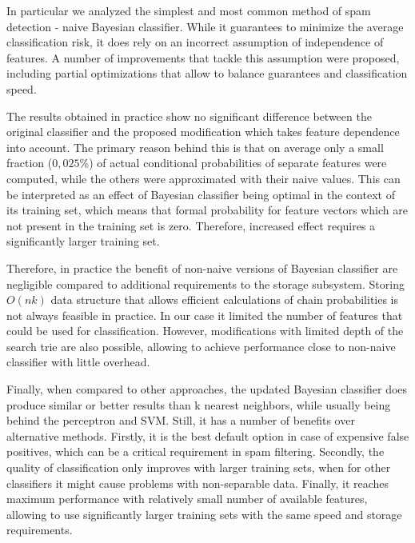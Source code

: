 \documentclass[12pt]{report}
\begin{document}
In particular we analyzed the simplest and most common method of spam detection - naive Bayesian classifier. While it guarantees to minimize the average classification risk, it does rely on an incorrect assumption of independence of features. A number of improvements that tackle this assumption were proposed, including partial optimizations that allow to balance guarantees and classification speed.

The results obtained in practice show no significant difference between the original classifier and the proposed modification which takes feature dependence into account. The primary reason behind this is that on average only a small fraction ($0,025\%$) of actual conditional probabilities of separate features were computed, while the others were approximated with their naive values. This can be interpreted as an effect of Bayesian classifier being optimal in the context of its training set, which means that formal probability for feature vectors which are not present in the training set is zero. Therefore, increased effect requires a significantly larger training set.

Therefore, in practice the benefit of non-naive versions of Bayesian classifier are negligible compared to additional requirements to the storage subsystem. Storing $O(nk)$ data structure that allows efficient calculations of chain probabilities is not always feasible in practice. In our case it limited the number of features that could be used for classification. However, modifications with limited depth of the search trie are also possible, allowing to achieve performance close to non-naive classifier with little overhead.

Finally, when compared to other approaches, the updated Bayesian classifier does produce similar or better results than k nearest neighbors, while usually being behind the perceptron and SVM. Still, it has a number of benefits over alternative methods. Firstly, it is the best default option in case of expensive false positives, which can be a critical requirement in spam filtering. Secondly, the quality of classification only improves with larger training sets, when for other classifiers it might cause problems with non-separable data. Finally, it reaches maximum performance with relatively small number of available features, allowing to use significantly larger training sets with the same speed and storage requirements.

\newpage


\end{document}
